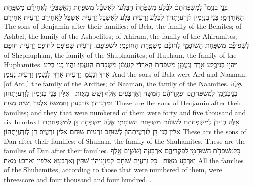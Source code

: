 {בְּנֵ֣י בִנְיָמִן֮ לְמִשְׁפְּחֹתָם֒ לְבֶ֗לַע מִשְׁפַּ֙חַת֙ הַבַּלְעִ֔י לְאַשְׁבֵּ֕ל מִשְׁפַּ֖חַת הָֽאַשְׁבֵּלִ֑י לַאֲחִירָ֕ם מִשְׁפַּ֖חַת הָאֲחִירָמִֽי׃}
{בְּנֵי בִנְיָמִין לְזַרְעֲיָתְהוֹן לְבֶלַע זַרְעִית בֶּלַע לְאַשְׁבֵּל זַרְעִית אַשְׁבֵּל לַאֲחִירָם זַרְעִית אֲחִירָם׃}
{The sons of Benjamin after their families: of Bela, the family of the Belaites; of Ashbel, the family of the Ashbelites; of Ahiram, the family of the Ahiramites;}{}
{לִשְׁפוּפָ֕ם מִשְׁפַּ֖חַת הַשּׁוּפָמִ֑י לְחוּפָ֕ם מִשְׁפַּ֖חַת הַחוּפָמִֽי׃}
{לִשְׁפוּפָם. זַרְעִית שְׁפוּפָם לְחוּפָם זַרְעִית חוּפָם׃}
{of Shephupham, the family of the Shuphamites; of Hupham, the family of the Huphamites.}{}
{וַיִּהְי֥וּ בְנֵי\maqqaf בֶ֖לַע אַ֣רְדְּ וְנַעֲמָ֑ן מִשְׁפַּ֙חַת֙ הָֽאַרְדִּ֔י לְנַֽעֲמָ֔ן מִשְׁפַּ֖חַת הַֽנַּעֲמִֽי׃}
{וַהֲווֹ בְנֵי בֶלַע אַרְדְּ וְנַעֲמָן זַרְעִית אַרְדְּ לְנַעֲמָן זַרְעִית נַעֲמָן׃}
{And the sons of Bela were Ard and Naaman; [of Ard,] the family of the Ardites; of Naaman, the family of the Naamites.}{}
{אֵ֥לֶּה בְנֵי\maqqaf בִנְיָמִ֖ן לְמִשְׁפְּחֹתָ֑ם וּפְקֻ֣דֵיהֶ֔ם חֲמִשָּׁ֧ה וְאַרְבָּעִ֛ים אֶ֖לֶף וְשֵׁ֥שׁ מֵאֽוֹת׃ \setuma }
{אִלֵּין בְּנֵי בִנְיָמִין לְזַרְעֲיָתְהוֹן וּמִנְיָנֵיהוֹן אַרְבְּעִין וְחַמְשָׁא אַלְפִין וְשֵׁית מְאָה׃}
{These are the sons of Benjamin after their families; and they that were numbered of them were forty and five thousand and six hundred.}{}
{אֵ֤לֶּה בְנֵי\maqqaf דָן֙ לְמִשְׁפְּחֹתָ֔ם לְשׁוּחָ֕ם מִשְׁפַּ֖חַת הַשּׁוּחָמִ֑י אֵ֛לֶּה מִשְׁפְּחֹ֥ת דָּ֖ן לְמִשְׁפְּחֹתָֽם׃}
{אִלֵּין בְּנֵי דָּן לְזַרְעֲיָתְהוֹן לְשׁוּחָם זַרְעִית שׁוּחָם אִלֵּין זַרְעֲיָת דָּן לְזַרְעֲיָתְהוֹן׃}
{These are the sons of Dan after their families: of Shuham, the family of the Shuhamites. These are the families of Dan after their families.}{}
{כׇּל\maqqaf מִשְׁפְּחֹ֥ת הַשּׁוּחָמִ֖י לִפְקֻדֵיהֶ֑ם אַרְבָּעָ֧ה וְשִׁשִּׁ֛ים אֶ֖לֶף וְאַרְבַּ֥ע מֵאֽוֹת׃ \setuma }
{כָּל זַרְעֲיָת שׁוּחָם לְמִנְיָנֵיהוֹן שִׁתִּין וְאַרְבְּעָא אַלְפִין וְאַרְבַּע מְאָה׃}
{All the families of the Shuhamites, according to those that were numbered of them, were threescore and four thousand and four hundred. .}{}
